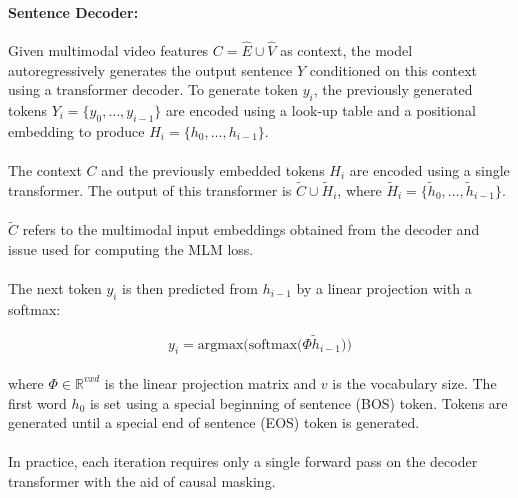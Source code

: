 \documentclass{article}
\begin{document}
\paragraph{Sentence Decoder:}Given multimodal video features $C = \hat{E} \cup \hat{V}$ as context, 
the model autoregressively generates the output sentence $Y$ conditioned on this context using a 
transformer decoder. To generate token $y_i$, the previously generated tokens $Y_i = \{y_0, \ldots, y_{i-1}\}$
are encoded using a look-up table and a positional embedding to produce $H_i = \{h_0,\ldots, h_{i-1}\}$.

\paragraph{}The context $C$ and the previously embedded tokens $H_i$ are encoded using a single
transformer. The output of this transformer is $\tilde{C} \cup \tilde{H}_i$, where 
$\tilde{H}_i = \{\tilde{h}_0, \ldots, \tilde{h}_{i-1}\}$. 

\paragraph{}$\tilde{C}$ refers to the multimodal input embeddings obtained from the decoder and issue
used for computing the MLM loss.

\paragraph{}The next token $y_i$ is then predicted from $h_{i-1}$ by a linear projection with a softmax:

\[
    y_i = \text{argmax(softmax(}\Phi \tilde{h}_{i-1}))
\]

\paragraph{}where $\Phi \in \mathbb{R}^{v x d}$ is the linear projection matrix and $v$ is the vocabulary
size. The first word $h_0$ is set using a special beginning of sentence (BOS) token. Tokens are 
generated until a special end of sentence (EOS) token is generated.

\paragraph{}In practice, each iteration requires only a single forward pass on the decoder transformer
with the aid of causal masking.
\end{document}
